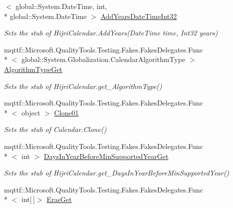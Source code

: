 \begin{DoxyCompactItemize}
$<$ global\-::\-System.\-Date\-Time, int, \\*
global\-::\-System.\-Date\-Time $>$ \hyperlink{class_system_1_1_globalization_1_1_fakes_1_1_stub_hijri_calendar_af3ecafb30c1542acfe82efbb0b373e38}{Add\-Years\-Date\-Time\-Int32}
\begin{DoxyCompactList}\small\item\em Sets the stub of Hijri\-Calendar.\-Add\-Years(\-Date\-Time time, Int32 years)\end{DoxyCompactList}\item 
mqttf\-::\-Microsoft.\-Quality\-Tools.\-Testing.\-Fakes.\-Fakes\-Delegates.\-Func\\*
$<$ global\-::\-System.\-Globalization.\-Calendar\-Algorithm\-Type $>$ \hyperlink{class_system_1_1_globalization_1_1_fakes_1_1_stub_hijri_calendar_ab7b0cb538fc8f466580b3a7c6b8d012b}{Algorithm\-Type\-Get}
\begin{DoxyCompactList}\small\item\em Sets the stub of Hijri\-Calendar.\-get\-\_\-\-Algorithm\-Type()\end{DoxyCompactList}\item 
mqttf\-::\-Microsoft.\-Quality\-Tools.\-Testing.\-Fakes.\-Fakes\-Delegates.\-Func\\*
$<$ object $>$ \hyperlink{class_system_1_1_globalization_1_1_fakes_1_1_stub_hijri_calendar_a868577aac9b61ba12aa7e8b34776b457}{Clone01}
\begin{DoxyCompactList}\small\item\em Sets the stub of Calendar.\-Clone()\end{DoxyCompactList}\item 
mqttf\-::\-Microsoft.\-Quality\-Tools.\-Testing.\-Fakes.\-Fakes\-Delegates.\-Func\\*
$<$ int $>$ \hyperlink{class_system_1_1_globalization_1_1_fakes_1_1_stub_hijri_calendar_aef1582dc2869bf53ee4a99720906e4b1}{Days\-In\-Year\-Before\-Min\-Supported\-Year\-Get}
\begin{DoxyCompactList}\small\item\em Sets the stub of Hijri\-Calendar.\-get\-\_\-\-Days\-In\-Year\-Before\-Min\-Supported\-Year()\end{DoxyCompactList}\item 
mqttf\-::\-Microsoft.\-Quality\-Tools.\-Testing.\-Fakes.\-Fakes\-Delegates.\-Func\\*
$<$ int\mbox{[}$\,$\mbox{]}$>$ \hyperlink{class_system_1_1_globalization_1_1_fakes_1_1_stub_hijri_calendar_a614f352e808a3078de5d40e933e22e28}{Eras\-Get}

\end{DoxyCompactItemize}
